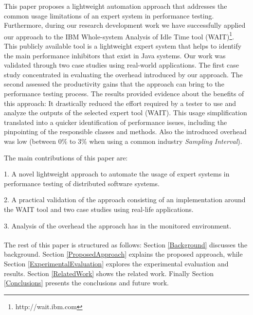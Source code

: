 \documentclass[runningheads,a4paper]{llncs}
\begin{document}
This paper proposes a lightweight automation approach that addresses the common
usage limitations of an expert system in performance testing. Furthermore,
during our research development work we have successfully applied our approach
to the IBM Whole-system Analysis of Idle Time tool (WAIT)\footnote{http://wait.ibm.com}. 
This publicly available tool is a lightweight expert system that helps to
identify the main performance inhibitors that exist in Java systems. Our work was 
validated through two case studies using real-world applications. The first case study 
concentrated in evaluating the overhead introduced by our approach. The second
assessed the productivity gains that the approach can bring to the
performance testing process. The results provided evidence about
the benefits of this approach: It drastically reduced the effort required by a
tester to use and analyze the outputs of the selected expert tool (WAIT). This
usage simplification translated into a quicker identification of performance issues, 
including the pinpointing of the responsible classes and methods. Also the
introduced overhead was low (between 0\% to 3\% when using a common industry
\emph{Sampling Interval}).

The main contributions of this paper are: 

1. A novel lightweight approach to automate the usage of expert systems in
performance testing of distributed software systems.

2. A practical validation of the approach consisting of an implementation
around the WAIT tool and two case studies using real-life applications.

3. Analysis of the overhead the approach has in the monitored environment.
\\\\
The rest of this paper is structured as follows: Section \ref{Background}
discusses the background. Section \ref{ProposedApproach} explains the proposed
approach, while Section \ref{ExperimentalEvaluation} explores the experimental 
evaluation and results. Section \ref{RelatedWork} shows the related work.
Finally Section \ref{Conclusions} presents the conclusions and future work.


\vspace{-7pt}
\end{document}
